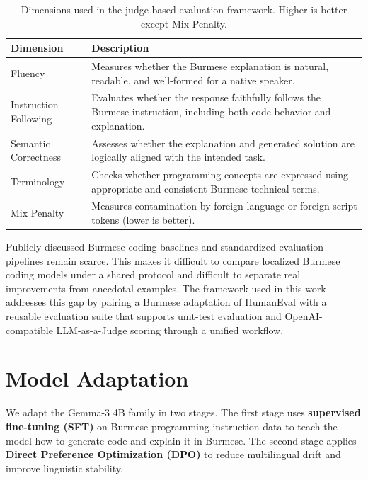 \documentclass[11pt]{article}
\begin{document}
\begin{table}[H]
\centering
\small
\renewcommand{\arraystretch}{1.2}
\caption{Dimensions used in the judge-based evaluation framework. Higher is better except Mix Penalty.}
\label{tab:rubric_dimensions}
\begin{tabular}{|p{5cm}|p{8cm}|}
\hline
\textbf{Dimension} & \textbf{Description} \\
\hline
Fluency & Measures whether the Burmese explanation is natural, readable, and well-formed for a native speaker. \\
\hline
Instruction Following & Evaluates whether the response faithfully follows the Burmese instruction, including both code behavior and explanation. \\
\hline
Semantic Correctness & Assesses whether the explanation and generated solution are logically aligned with the intended task. \\
\hline
Terminology & Checks whether programming concepts are expressed using appropriate and consistent Burmese technical terms. \\
\hline
Mix Penalty & Measures contamination by foreign-language or foreign-script tokens (lower is better). \\
\hline
\end{tabular}
\end{table}

Publicly discussed Burmese coding baselines and standardized evaluation pipelines remain scarce. This makes it difficult to compare localized Burmese coding models under a shared protocol and difficult to separate real improvements from anecdotal examples. The framework used in this work addresses this gap by pairing a Burmese adaptation of HumanEval with a reusable evaluation suite that supports unit-test evaluation and OpenAI-compatible LLM-as-a-Judge scoring through a unified workflow.

\section{Model Adaptation}
We adapt the Gemma-3 4B family in two stages. The first stage uses \textbf{supervised fine-tuning (SFT)} on Burmese programming instruction data to teach the model how to generate code and explain it in Burmese. The second stage applies \textbf{Direct Preference Optimization (DPO)} to reduce multilingual drift and improve linguistic stability.
\end{document}
